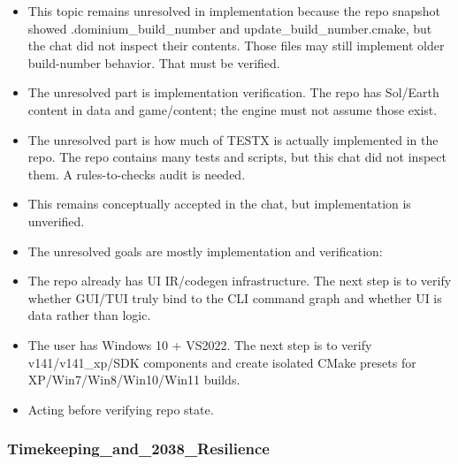 \documentclass[11pt,a4paper]{report}
\begin{document}
\begin{itemize}
\item This topic remains unresolved in implementation because the repo snapshot showed .dominium\_build\_number and update\_build\_number.cmake, but the chat did not inspect their contents. Those files may still implement older build-number behavior. That must be verified.
\item The unresolved part is implementation verification. The repo has Sol/Earth content in data and game/content; the engine must not assume those exist.
\item The unresolved part is how much of TESTX is actually implemented in the repo. The repo contains many tests and scripts, but this chat did not inspect them. A rules-to-checks audit is needed.
\item This remains conceptually accepted in the chat, but implementation is unverified.
\item The unresolved goals are mostly implementation and verification:
\item The repo already has UI IR/codegen infrastructure. The next step is to verify whether GUI/TUI truly bind to the CLI command graph and whether UI is data rather than logic.
\item The user has Windows 10 + VS2022. The next step is to verify v141/v141\_xp/SDK components and create isolated CMake presets for XP/Win7/Win8/Win10/Win11 builds.
\item Acting before verifying repo state.
\end{itemize}

\subsubsection{Timekeeping\_and\_2038\_Resilience}
\end{document}
